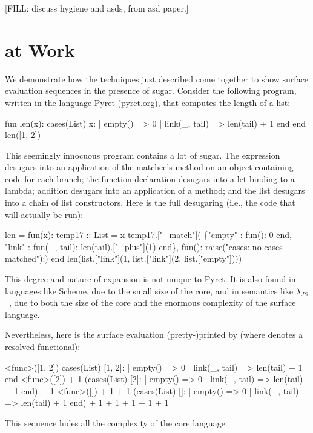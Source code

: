 [FILL: discuss hygiene and asds, from asd paper.]


\section{{\Resugarer} at Work}
\label{sec:reval-pyret-example}

We demonstrate how the techniques just described come together to show
surface evaluation sequences in the presence of sugar. Consider the
following program, written in the language Pyret (\url{pyret.org}), 
that computes the length of a list:
\begin{Codes}
    fun len(x):
      cases(List) x:
        | empty() => 0
        | link(_, tail) => len(tail) + 1
      end
    end
    len([1, 2])
\end{Codes}
This seemingly innocuous program contains a lot of sugar. The 
expression desugars into an application of the matchee's 
method on an object containing code for each branch; the function
declaration desugars into a let binding to a lambda; addition desugars
into an application of a  method; and the list \Code{[1, 2]}
desugars into a chain of list constructors. Here is the full desugaring
(i.e., the code that will actually be run):
\begin{Codes}
len = fun(x):
    temp17 :: List = x
    temp17.["_match"](
      \{"empty" : fun(): 0 end,
       "link" : fun(_, tail):
                len(tail).["_plus"](1) end\},
      fun(): raise("cases: no cases matched");)
    end
len(list.["link"](1, list.["link"](2, list.["empty"])))
\end{Codes}
This degree and nature of expansion is not unique to Pyret.
It is also found in languages like Scheme, due
to the small size of the core, and in semantics like
$\lambda_{JS}$~\cite{lambda-js},
due to both the size of the core and the enormous complexity
of the surface language.

Nevertheless, here is the surface evaluation (pretty-)printed by {\Resugarer} (where
 denotes a resolved functional):
\begin{Codes}
\SurfStep <func>([1, 2])
\SurfStep cases(List) [1, 2]:
      | empty() => 0
      | link(_, tail) => len(tail) + 1
    end
\SurfStep <func>([2]) + 1
\SurfStep (cases(List) [2]:
      | empty() => 0
      | link(_, tail) => len(tail) + 1
    end) + 1
\SurfStep <func>([]) + 1 + 1
\SurfStep (cases(List) []:
      | empty() => 0
      | link(_, tail) => len(tail) + 1
    end) + 1 + 1
 + 1 + 1
 + 1
\end{Codes}
This sequence hides all the complexity of the core language.


